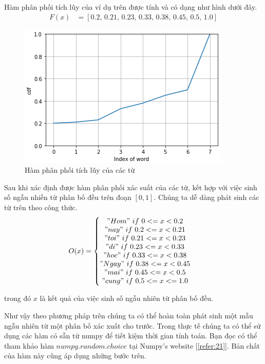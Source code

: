 Hàm phân phối tích lũy của ví dụ trên được tính và có dạng như hình dưới đây.
\begin{align*}
  F(x) &= [0.2, \, 0.21, \, 0.23, \, 0.33, \, 0.38, \, 0.45, \, 0.5, \, 1.0]
\end{align*}

\clearpage
\begin{figure}[h!]
	\centering
		\includegraphics[width=0.6\columnwidth]{chapter07/figure-sec3/cdf.jpg}
		\centering
	\caption{Hàm phân phối tích lũy của các từ}
\end{figure}

Sau khi xác định được hàm phân phối xác suất của các từ, kết hợp với việc sinh số ngẫu nhiền từ phân bố đều trên đoạn $[0, 1]$. Chúng ta dễ dàng phát sinh các từ trên theo công thức.
\begin{align*}
  O(x) &= \left\{
                \begin{matrix}
                "Hom" \ if \ 0 <= x < 0.2\\ 
                "nay" \ if \ 0.2 <= x < 0.21\\ 
                "toi" \ if \ 0.21 <= x < 0.23\\ 
                "di" \ if \ 0.23 <= x < 0.33\\ 
                "hoc" \ if \ 0.33 <= x < 0.38\\ 
                "Ngay" \ if \ 0.38 <= x < 0.45\\ 
                "mai" \ if \ 0.45 <= x < 0.5\\
                "cung" \ if \ 0.5 <= x <= 1.0 \\
                \end{matrix}\right.
\end{align*}

trong đó $x$ là kết quả của việc sinh số ngẫu nhiên từ phân bố đều.

Như vậy theo phương pháp trên chúng ta có thể hoàn toàn phát sinh một mẫu ngẫu nhiên từ một phân bố xác xuất cho trước. Trong thực tế chúng ta có thể sử dụng các hàm có sẵn từ numpy để tiết kiệm thời gian tính toán. Bạn đọc có thể tham khảo hàm $numpy.random.choice$ tại Numpy's website [\ref{refer:21}]. Bản chất của hàm này cũng áp dụng những bước trên.

